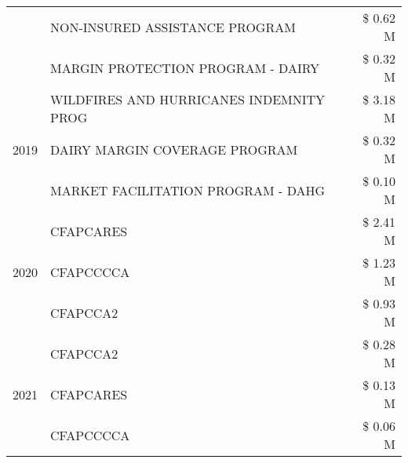 \begin{tabular}{llr}
 & NON-INSURED ASSISTANCE PROGRAM & \$ 0.62 M \\
 & MARGIN PROTECTION PROGRAM - DAIRY & \$ 0.32 M \\
\cline{1-3}
\multirow[t]{3}{*}{2019} & WILDFIRES AND HURRICANES INDEMNITY PROG & \$ 3.18 M \\
 & DAIRY MARGIN COVERAGE PROGRAM & \$ 0.32 M \\
 & MARKET FACILITATION PROGRAM - DAHG & \$ 0.10 M \\
\cline{1-3}
\multirow[t]{3}{*}{2020} & CFAPCARES & \$ 2.41 M \\
 & CFAPCCCCA & \$ 1.23 M \\
 & CFAPCCA2 & \$ 0.93 M \\
\cline{1-3}
\multirow[t]{3}{*}{2021} & CFAPCCA2 & \$ 0.28 M \\
 & CFAPCARES & \$ 0.13 M \\
 & CFAPCCCCA & \$ 0.06 M \\
\cline{1-3}
\bottomrule
\end{tabular}
